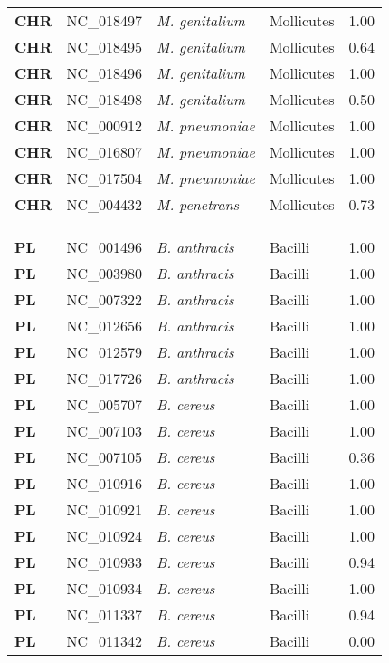\begin{adjustwidth}{-3cm}{2cm}
{\begin{supertabular}{>{\bfseries}l|p{0.1\textwidth}p{0.14\textwidth}l|l}
CHR & NC\_018497 & \textit{M. genitalium} & Mollicutes & 1.00\\
CHR & NC\_018495 & \textit{M. genitalium} & Mollicutes & 0.64\\
CHR & NC\_018496 & \textit{M. genitalium} & Mollicutes & 1.00\\
CHR & NC\_018498 & \textit{M. genitalium} & Mollicutes & 0.50\\
CHR & NC\_000912 & \textit{M. pneumoniae} & Mollicutes & 1.00\\
CHR & NC\_016807 & \textit{M. pneumoniae} & Mollicutes & 1.00\\
CHR & NC\_017504 & \textit{M. pneumoniae} & Mollicutes & 1.00\\
CHR & NC\_004432 & \textit{M. penetrans} & Mollicutes & 0.73\\
\\
\\
\hline\\
PL & NC\_001496 & \textit{B. anthracis} & Bacilli & 1.00\\
PL & NC\_003980 & \textit{B. anthracis} & Bacilli & 1.00\\
PL & NC\_007322 & \textit{B. anthracis} & Bacilli & 1.00\\
PL & NC\_012656 & \textit{B. anthracis} & Bacilli & 1.00\\
PL & NC\_012579 & \textit{B. anthracis} & Bacilli & 1.00\\
PL & NC\_017726 & \textit{B. anthracis} & Bacilli & 1.00\\
PL & NC\_005707 & \textit{B. cereus} & Bacilli & 1.00\\
PL & NC\_007103 & \textit{B. cereus} & Bacilli & 1.00\\
PL & NC\_007105 & \textit{B. cereus} & Bacilli & 0.36\\
PL & NC\_010916 & \textit{B. cereus} & Bacilli & 1.00\\
PL & NC\_010921 & \textit{B. cereus} & Bacilli & 1.00\\
PL & NC\_010924 & \textit{B. cereus} & Bacilli & 1.00\\
PL & NC\_010933 & \textit{B. cereus} & Bacilli & 0.94\\
PL & NC\_010934 & \textit{B. cereus} & Bacilli & 1.00\\
PL & NC\_011337 & \textit{B. cereus} & Bacilli & 0.94\\
PL & NC\_011342 & \textit{B. cereus} & Bacilli & 0.00\\

\end{supertabular}}
\end{adjustwidth}
